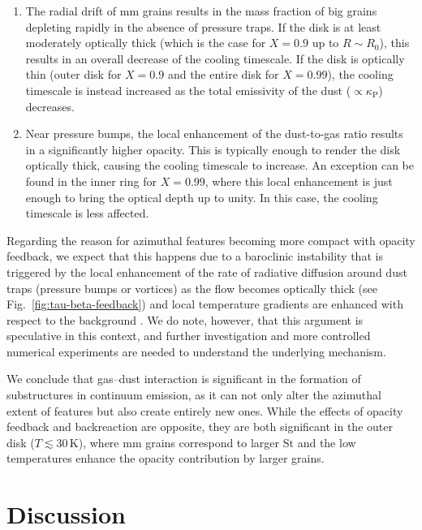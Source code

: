 \documentclass[fleqn,usenatbib,useAMS]{mnras}
\newcommand{\kappaP}{\kappa_\mathrm{P}}
\newcommand{\St}{\mathrm{St}}
\begin{document}
\begin{enumerate}
	\item The radial drift of mm grains results in the mass fraction of big grains depleting rapidly in the absence of pressure traps. If the disk is at least moderately optically thick (which is the case for $X=0.9$ up to $R\sim R_0$), this results in an overall decrease of the cooling timescale. If the disk is optically thin (outer disk for $X=0.9$ and the entire disk for $X=0.99$), the cooling timescale is instead increased as the total emissivity of the dust ($\propto\kappaP$) decreases.
	\item Near pressure bumps, the local enhancement of the dust-to-gas ratio results in a significantly higher opacity. This is typically enough to render the disk optically thick, causing the cooling timescale to increase. An exception can be found in the inner ring for $X=0.99$, where this local enhancement is just enough to bring the optical depth up to unity. In this case, the cooling timescale is less affected.
\end{enumerate}

Regarding the reason for azimuthal features becoming more compact with opacity feedback, we expect that this happens due to a baroclinic instability \citep{lesur-papaloizou-2010} that is triggered by the local enhancement of the rate of radiative diffusion around dust traps (pressure bumps or vortices) as the flow becomes optically thick (see Fig.~\ref{fig:tau-beta-feedback}) and local temperature gradients are enhanced with respect to the background \citep[see also][]{petersen-etal-2007a,petersen-etal-2007b}. We do note, however, that this argument is speculative in this context, and further investigation and more controlled numerical experiments are needed to understand the underlying mechanism.

We conclude that gas--dust interaction is significant in the formation of substructures in continuum emission, as it can not only alter the azimuthal extent of features but also create entirely new ones. While the effects of opacity feedback and backreaction are opposite, they are both significant in the outer disk ($T\lesssim30$\,K), where mm grains correspond to larger $\St$ and the low temperatures enhance the opacity contribution by larger grains.

\section{Discussion}
\label{sec:discussion}
\end{document}
